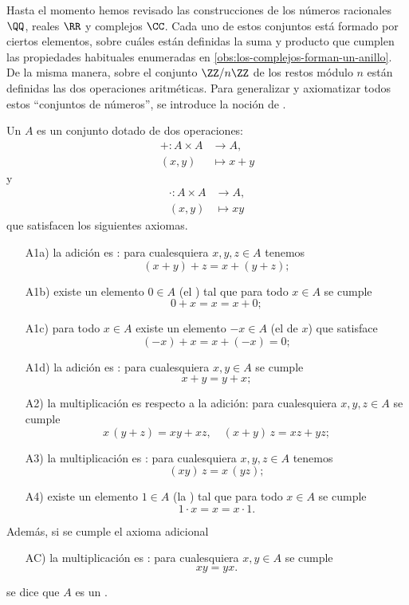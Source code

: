 Hasta el momento hemos revisado las construcciones de los números racionales
$\QQ$, reales $\RR$ y complejos $\CC$. Cada uno de estos conjuntos está formado
por ciertos elementos, sobre cuáles están definidas la suma y producto que
cumplen las propiedades habituales enumeradas en
\ref{obs:los-complejos-forman-un-anillo}. De la misma manera, sobre el conjunto
$\ZZ/n\ZZ$ de los restos módulo $n$ están definidas las dos operaciones
aritméticas. Para generalizar y axiomatizar todos estos ``conjuntos de
números'', se introduce la noción de .

\begin{definicion}
  Un  $A$ es un conjunto dotado de dos
  operaciones: 
  \begin{align*}
    +\colon A\times A & \to A,\\
    (x,y) & \mapsto x+y
  \end{align*}
  y 
  \begin{align*}
    \cdot\colon A\times A & \to A,\\
    (x,y) & \mapsto xy
  \end{align*}
  que satisfacen los siguientes axiomas.

  \begin{enumerate}
  \item[A1a)] la adición es : para cualesquiera $x,y,z\in A$
    tenemos
    $$(x+y)+z = x+(y+z);$$

  \item[A1b)] existe un elemento $0\in A$ (el ) tal que para todo
    $x\in A$ se cumple
    $$0+x = x = x+0;$$

  \item[A1c)] para todo $x\in A$ existe un elemento $-x\in A$ (el 
    de $x$) que satisface
    $$(-x) + x = x + (-x) = 0;$$

  \item[A1d)] la adición es : para cualesquiera $x,y\in A$ se
    cumple
    $$x+y = y+x;$$

  \item[A2)] la multiplicación es 
    respecto a la adición: para cualesquiera $x,y,z\in A$ se cumple
    $$x\,(y+z) = xy + xz, \quad (x+y)\,z = xz + yz;$$

  \item[A3)] la multiplicación es : para cualesquiera
    $x,y,z\in A$ tenemos
    $$(xy)\,z = x\,(yz);$$

  \item[A4)] existe un elemento $1\in A$ (la ) tal que para todo
    $x\in A$ se cumple
    $$1\cdot x = x = x\cdot 1.$$
  \end{enumerate}
  Además, si se cumple el axioma adicional
  \begin{enumerate}
  \item[AC)] la multiplicación es : para cualesquiera
    $x,y\in A$ se cumple
    $$xy = yx.$$
  \end{enumerate}
  se dice que $A$ es un .
\end{definicion}

